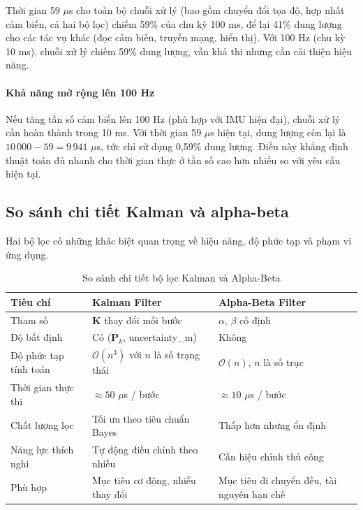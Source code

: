 Thời gian 59 $\mu$s cho toàn bộ chuỗi xử lý (bao gồm chuyển đổi tọa độ, hợp nhất cảm biến, cả hai bộ lọc) chiếm 59\% của chu kỳ 100 ms, để lại 41\% dung lượng cho các tác vụ khác (đọc cảm biến, truyền mạng, hiển thị). Với 100 Hz (chu kỳ 10 ms), chuỗi xử lý chiếm 59\% dung lượng, vẫn khả thi nhưng cần cải thiện hiệu năng.

\paragraph{Khả năng mở rộng lên 100 Hz\\} Nếu tăng tần số cảm biến lên 100 Hz (phù hợp với IMU hiện đại), chuỗi xử lý cần hoàn thành trong 10 ms. Với thời gian 59 $\mu$s hiện tại, dung lượng còn lại là $10\,000 - 59 = 9\,941$ $\mu$s, tức chỉ sử dụng 0,59\% dung lượng. Điều này khẳng định thuật toán đủ nhanh cho thời gian thực ở tần số cao hơn nhiều so với yêu cầu hiện tại.

\subsection{So sánh chi tiết Kalman và alpha-beta}

\hspace{0.5cm} Hai bộ lọc có những khác biệt quan trọng về hiệu năng, độ phức tạp và phạm vi ứng dụng.

\begin{table}[H]
\centering
\caption{So sánh chi tiết bộ lọc Kalman và Alpha-Beta}
\label{tab:kf-vs-ab}
\begin{tabularx}{\linewidth}{lXX}
\toprule
\textbf{Tiêu chí} & \textbf{Kalman Filter} & \textbf{Alpha-Beta Filter} \\
\midrule
Tham số & $\mathbf{K}$ thay đổi mỗi bước & $\alpha$, $\beta$ cố định \\
Độ bất định & Có ($\mathbf{P}_k$, uncertainty\_m) & Không \\
Độ phức tạp tính toán & $\mathcal{O}(n^3)$ với $n$ là số trạng thái & $\mathcal{O}(n)$, $n$ là số trục \\
Thời gian thực thi & $\approx 50$ $\mu$s / bước & $\approx 10$ $\mu$s / bước \\
Chất lượng lọc & Tối ưu theo tiêu chuẩn Bayes & Thấp hơn nhưng ổn định \\
Năng lực thích nghi & Tự động điều chỉnh theo nhiễu & Cần hiệu chỉnh thủ công \\
Phù hợp & Mục tiêu cơ động, nhiễu thay đổi & Mục tiêu di chuyển đều, tài nguyên hạn chế \\
\bottomrule
\end{tabularx}
\end{table}

